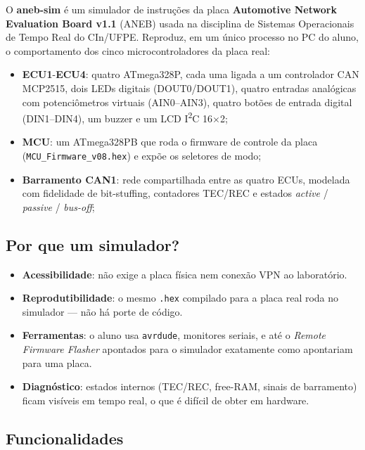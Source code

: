 \documentclass[12pt,a4paper]{article}
\begin{document}
O \textbf{aneb-sim} é um simulador de instruções da placa
\textbf{Automotive Network Evaluation Board v1.1} (ANEB) usada na
disciplina de Sistemas Operacionais de Tempo Real do CIn/UFPE.
Reproduz, em um único processo no PC do aluno, o comportamento dos
cinco microcontroladores da placa real:

\begin{itemize}[nosep]
  \item \textbf{ECU1}-\textbf{ECU4}: quatro ATmega328P, cada uma
        ligada a um controlador CAN MCP2515, dois LEDs digitais
        (DOUT0/DOUT1), quatro entradas analógicas com
        potenciômetros virtuais (AIN0--AIN3), quatro botões de
        entrada digital (DIN1--DIN4), um buzzer e um LCD I\textsuperscript{2}C
        16$\times$2;
  \item \textbf{MCU}: um ATmega328PB que roda o firmware de controle
        da placa (\texttt{MCU\_Firmware\_v08.hex}) e expõe os
        seletores de modo;
  \item \textbf{Barramento CAN1}: rede compartilhada entre as quatro
        ECUs, modelada com fidelidade de bit-stuffing, contadores
        TEC/REC e estados \emph{active} / \emph{passive} / \emph{bus-off};
\end{itemize}

\subsection{Por que um simulador?}

\begin{itemize}[nosep]
  \item \textbf{Acessibilidade}: não exige a placa física nem
        conexão VPN ao laboratório.
  \item \textbf{Reprodutibilidade}: o mesmo \texttt{.hex} compilado
        para a placa real roda no simulador --- não há porte de
        código.
  \item \textbf{Ferramentas}: o aluno usa \texttt{avrdude}, monitores
        seriais, e até o \emph{Remote Firmware Flasher} apontados
        para o simulador exatamente como apontariam para uma placa.
  \item \textbf{Diagnóstico}: estados internos (TEC/REC, free-RAM,
        sinais de barramento) ficam visíveis em tempo real, o que
        é difícil de obter em hardware.
\end{itemize}

\subsection{Funcionalidades}
\end{document}
